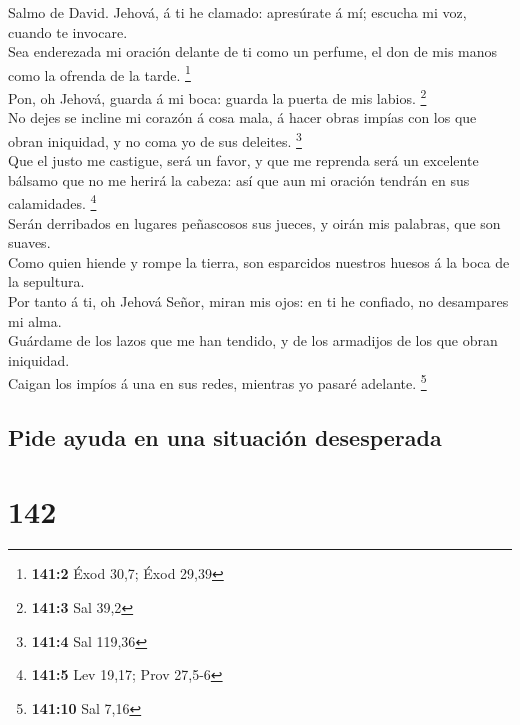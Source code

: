  Salmo de David. Jehová, á ti he clamado: apresúrate á mí;
escucha mi voz, cuando te invocare.\\
 Sea enderezada mi oración delante de ti como un perfume, el
don de mis manos como la ofrenda de la tarde. \footnote{\textbf{141:2}
  Éxod 30,7; Éxod 29,39}\\
 Pon, oh Jehová, guarda á mi boca: guarda la puerta de mis
labios. \footnote{\textbf{141:3} Sal 39,2}\\
 No dejes se incline mi corazón á cosa mala, á hacer obras
impías con los que obran iniquidad, y no coma yo de sus deleites.
\footnote{\textbf{141:4} Sal 119,36}\\
 Que el justo me castigue, será un favor, y que me reprenda
será un excelente bálsamo que no me herirá la cabeza: así que aun mi
oración tendrán en sus calamidades. \footnote{\textbf{141:5} Lev 19,17;
  Prov 27,5-6}\\
 Serán derribados en lugares peñascosos sus jueces, y oirán
mis palabras, que son suaves.\\
 Como quien hiende y rompe la tierra, son esparcidos
nuestros huesos á la boca de la sepultura.\\
 Por tanto á ti, oh Jehová Señor, miran mis ojos: en ti he
confiado, no desampares mi alma.\\
 Guárdame de los lazos que me han tendido, y de los
armadijos de los que obran iniquidad.\\
 Caigan los impíos á una en sus redes, mientras yo pasaré
adelante. \footnote{\textbf{141:10} Sal 7,16}

\hypertarget{pide-ayuda-en-una-situaciuxf3n-desesperada}{%
\subsection{Pide ayuda en una situación
desesperada}\label{pide-ayuda-en-una-situaciuxf3n-desesperada}}

\hypertarget{section-141}{%
\section{142}\label{section-141}}

